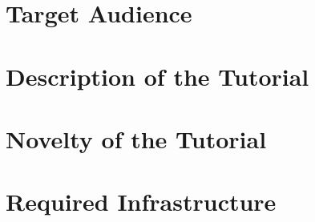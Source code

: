 \documentclass[conference]{IEEEtran}
\begin{document}
\section{Target Audience}

\section{Description of the Tutorial}





\section{Novelty of the Tutorial}

\section{Required Infrastructure} 
\end{document}
